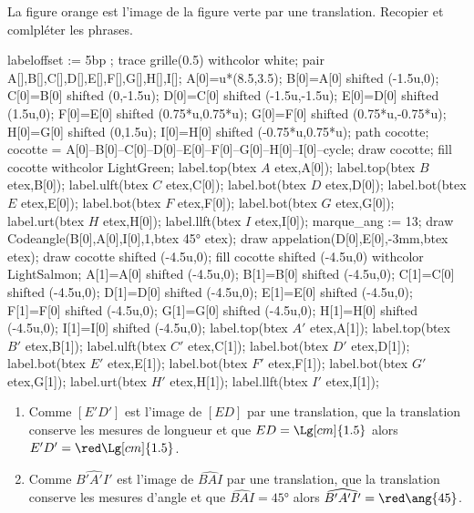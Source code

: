 \begin{corrige}
    La figure orange est l'image de la figure verte par une translation. Recopier et comlpléter les phrases.
    \hspace*{-13mm}
    \begin{Geometrie}[CoinHD={(9u,4u)}]
        labeloffset := 5bp ;
        trace grille(0.5) withcolor white;
        pair A[],B[],C[],D[],E[],F[],G[],H[],I[];
        A[0]=u*(8.5,3.5);
        B[0]=A[0] shifted (-1.5u,0);
        C[0]=B[0] shifted (0,-1.5u);
        D[0]=C[0] shifted (-1.5u,-1.5u);
        E[0]=D[0] shifted (1.5u,0);
        F[0]=E[0] shifted (0.75*u,0.75*u);
        G[0]=F[0] shifted (0.75*u,-0.75*u);
        H[0]=G[0] shifted (0,1.5u);
        I[0]=H[0] shifted (-0.75*u,0.75*u);
        path cocotte;
        cocotte = A[0]--B[0]--C[0]--D[0]--E[0]--F[0]--G[0]--H[0]--I[0]--cycle;
        draw cocotte;
        fill cocotte withcolor LightGreen;
        label.top(btex $A$ etex,A[0]);
        label.top(btex $B$ etex,B[0]);
        label.ulft(btex $C$ etex,C[0]);
        label.bot(btex $D$ etex,D[0]);
        label.bot(btex $E$ etex,E[0]);
        label.bot(btex $F$ etex,F[0]);
        label.bot(btex $G$ etex,G[0]);
        label.urt(btex $H$ etex,H[0]);
        label.llft(btex $I$ etex,I[0]);
        marque_ang := 13;
        draw Codeangle(B[0],A[0],I[0],1,btex \ang{45} etex);        
        draw appelation(D[0],E[0],-3mm,btex  etex);
        draw cocotte shifted (-4.5u,0);
        fill cocotte shifted (-4.5u,0) withcolor LightSalmon;
        A[1]=A[0] shifted (-4.5u,0);
        B[1]=B[0] shifted (-4.5u,0);
        C[1]=C[0] shifted (-4.5u,0);
        D[1]=D[0] shifted (-4.5u,0);
        E[1]=E[0] shifted (-4.5u,0);
        F[1]=F[0] shifted (-4.5u,0);
        G[1]=G[0] shifted (-4.5u,0);
        H[1]=H[0] shifted (-4.5u,0);
        I[1]=I[0] shifted (-4.5u,0);
        label.top(btex $A'$ etex,A[1]);
        label.top(btex $B'$ etex,B[1]);
        label.ulft(btex $C'$ etex,C[1]);
        label.bot(btex $D'$ etex,D[1]);
        label.bot(btex $E'$ etex,E[1]);
        label.bot(btex $F'$ etex,F[1]);
        label.bot(btex $G'$ etex,G[1]);
        label.urt(btex $H'$ etex,H[1]);
        label.llft(btex $I'$ etex,I[1]);
    \end{Geometrie}
    \begin{enumerate}
        \item Comme {\red $[E'D']$ est l'image de $[ED]$ par une translation, que la translation conserve les mesures de longueur} et que $ED=\Lg[cm]{1.5}$ alors $E'D'={\red \Lg[cm]{1.5}}$.
        \item Comme {\red $\widehat{B'A'I'}$ est l'image de $\widehat{BAI}$ par une translation, que la translation conserve les mesures d'angle } et que $\widehat{BAI}=\ang{45}$ alors $\widehat{B'A'I'}={\red \ang{45}}$.
    \end{enumerate}
\end{corrige}

